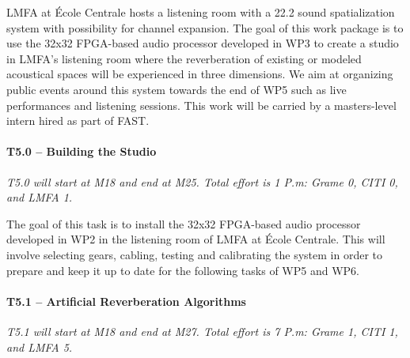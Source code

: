 \documentclass[a4paper,9pt]{extarticle}
\newcommand{\PP}{FAST}
\begin{document}
LMFA at École Centrale hosts a listening room with a 22.2 sound spatialization system with possibility for channel expansion. The goal of this work package is to use the 32x32 FPGA-based audio processor developed in WP3 to create a studio in LMFA's listening room where the reverberation of existing or modeled acoustical spaces will be experienced in three dimensions. We aim at organizing public events around this system towards the end of WP5 such as live performances and listening sessions. This work will be carried by a masters-level intern hired as part of \PP{}.

\paragraph{T5.0 -- Building the Studio}

\textit{T5.0 will start at M18 and end at M25. Total effort is 1 P.m: Grame 0, CITI 0, and LMFA 1.}

The goal of this task is to install the 32x32 FPGA-based audio processor developed in WP2 in the listening room of LMFA at École Centrale.
This will involve selecting gears, cabling, testing and calibrating the system in order to prepare and keep it up to date for the following tasks of WP5 and WP6. 

\paragraph{T5.1 -- Artificial Reverberation Algorithms}

\textit{T5.1 will start at M18 and end at M27. Total effort is 7 P.m: Grame 1, CITI 1, and LMFA 5.}
\end{document}
